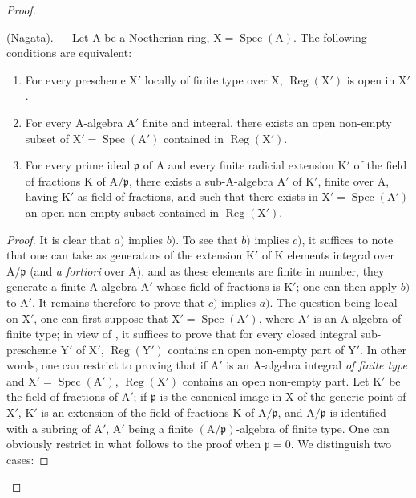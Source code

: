 \begin{proof}
\begin{theorem}[6.12.4]
\label{IV.6.12.4}
\textnormal{(Nagata).} --- Let $\mathrm{A}$ be a Noetherian ring, $\mathrm{X}=\operatorname{Spec}(\mathrm{A})$. The
following conditions are equivalent:
\begin{enumerate}[label=\emph{\alph*)}]
  \item For every prescheme $\mathrm{X}'$ locally of finite type over $\mathrm{X}$, $\operatorname{Reg}(\mathrm{X}')$ is open in $\mathrm{X}'$.
  \item For every $\mathrm{A}$-algebra $\mathrm{A}'$ finite and integral, there exists an open non-empty subset of
$\mathrm{X}'=\operatorname{Spec}(\mathrm{A}')$ contained in $\operatorname{Reg}(\mathrm{X}')$.
  \item For every prime ideal $\mathfrak{p}$ of $\mathrm{A}$ and every finite radicial extension $\mathrm{K}'$ of the field of fractions $\mathrm{K}$
of $\mathrm{A}/\mathfrak{p}$, there exists a sub-$\mathrm{A}$-algebra $\mathrm{A}'$ of $\mathrm{K}'$, finite over $\mathrm{A}$, having $\mathrm{K}'$ as field of fractions, and
such that there exists in $\mathrm{X}'=\operatorname{Spec}(\mathrm{A}')$ an open non-empty subset contained in $\operatorname{Reg}(\mathrm{X}')$.
\end{enumerate}
\end{theorem}

\begin{proof}
It is clear that $a)$ implies $b)$. To see that $b)$ implies $c)$, it suffices to note
that one can take as generators of the extension $\mathrm{K}'$ of $\mathrm{K}$ elements integral over $\mathrm{A}/\mathfrak{p}$
(and \emph{a fortiori} over $\mathrm{A}$), and as these elements are finite in number, they generate a finite
$\mathrm{A}$-algebra $\mathrm{A}'$ whose field of fractions is $\mathrm{K}'$; one can then apply $b)$ to $\mathrm{A}'$.
It remains therefore to prove that $c)$ implies $a)$. The question being local on $\mathrm{X}'$, one can
first suppose that $\mathrm{X}'=\operatorname{Spec}(\mathrm{A}')$, where $\mathrm{A}'$ is an $\mathrm{A}$-algebra of finite type; in view of
, it suffices to prove that for every closed integral sub-prescheme $\mathrm{Y}'$
of $\mathrm{X}'$, $\operatorname{Reg}(\mathrm{Y}')$ contains an open non-empty part of $\mathrm{Y}'$. In other words, one can restrict
to proving that if $\mathrm{A}'$ is an $\mathrm{A}$-algebra integral \emph{of finite type} and $\mathrm{X}'=\operatorname{Spec}(\mathrm{A}')$,
$\operatorname{Reg}(\mathrm{X}')$ contains an open non-empty part. Let $\mathrm{K}'$ be the field of fractions of $\mathrm{A}'$;
if $\mathfrak{p}$ is the canonical image in $\mathrm{X}$ of the generic point of $\mathrm{X}'$, $\mathrm{K}'$ is an extension of the
field of fractions $\mathrm{K}$ of $\mathrm{A}/\mathfrak{p}$, and $\mathrm{A}/\mathfrak{p}$ is identified with a subring of $\mathrm{A}'$, $\mathrm{A}'$ being a finite
$(\mathrm{A}/\mathfrak{p})$-algebra of finite type. One can obviously restrict in what follows to the proof
when $\mathfrak{p}=0$. We distinguish two cases:


\end{proof}
\end{proof}
